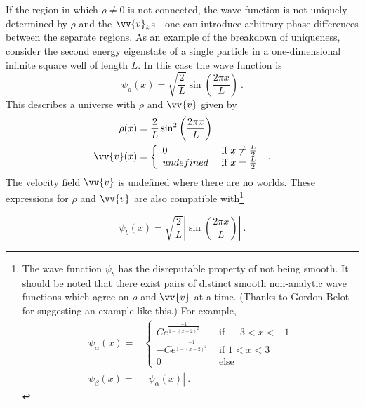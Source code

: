 \documentclass[onecolumn,secnumarabic,balancelastpage,amsmath,amssymb,nofootinbib]{article}
\begin{document}
If the region in which $\rho\neq0$ is not connected, the wave function is not uniquely determined by $\rho$ and the $\vv{v}_k$s---one can introduce arbitrary phase differences between the separate regions.  As an example of the breakdown of uniqueness, consider the second energy eigenstate of a single particle in a one-dimensional infinite square well of length $L$.  In this case the wave function is
\begin{equation}
\psi_a(x)=\sqrt{\frac{2}{L}}\sin\left(\frac{2\pi x}{L}\right)\ .
\label{trouble}
\end{equation}
This describes a universe with $\rho$ and $\vv{v}$ given by
\begin{align}
\rho(x)&=\frac{2}{L}\sin^2\left(\frac{2\pi x}{L}\right)
\nonumber
\\
\vv{v}(x)&=\left\{\begin{array}{ll} 0 & \mbox{   if }x\neq \frac{L}{2} \\ undefined & \mbox{   if }x= \frac{L}{2} \end{array}\right.\ .
\label{dwbwoe}
\end{align}
The velocity field $\vv{v}$ is undefined where there are no worlds.  These expressions for $\rho$ and $\vv{v}$ are also compatible with\footnote{The wave function $\psi_b$ has the disreputable property of not being smooth.  It should be noted that there exist pairs of distinct smooth non-analytic wave functions which agree on $\rho$ and $\vv{v}$ at a time. (Thanks to Gordon Belot for suggesting an example like this.)  For example, %
\begin{align}
\psi_{\alpha}(x)=&\left\{\begin{array}{ll}
C e^{\frac{-1}{1-(x+2)^2}} & \mbox{       if }-3<x<-1 \\ -C e^{\frac{-1}{1-(x-2)^2}} & \mbox{       if }1<x<3 \\ 0 & \mbox{       else}\end{array}\right.
\nonumber
\\
\psi_{\beta}(x)=& \  |\psi_{\alpha}(x)| \ .
\nonumber
\end{align}}

\begin{equation}
\psi_b(x)=\sqrt{\frac{2}{L}}\left|\sin\left(\frac{2\pi x}{L}\right)\right| \ .
\label{evil}
\end{equation}
\end{document}
